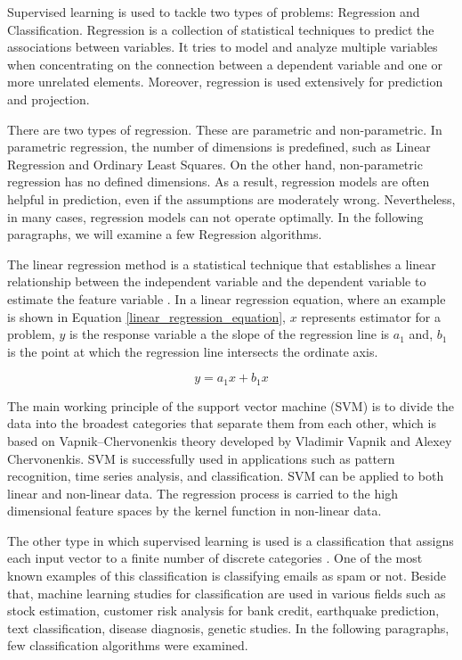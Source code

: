 Supervised learning is used to tackle two types of problems: Regression and Classification. Regression is a collection of statistical techniques to predict the associations between variables. It tries to model and analyze multiple variables when concentrating on the connection between a dependent variable and one or more unrelated elements. Moreover, regression is used extensively for prediction and projection.

There are two types of regression. These are parametric and non-parametric. In parametric regression, the number of dimensions is predefined, such as Linear Regression and Ordinary Least Squares. On the other hand, non-parametric regression has no defined dimensions. As a result, regression models are often helpful in prediction, even if the assumptions are moderately wrong. Nevertheless, in many cases, regression models can not operate optimally. In the following paragraphs, we will examine a few Regression algorithms.

The linear regression method is a statistical technique that establishes a linear relationship between the independent variable and the dependent variable to estimate the feature variable \cite{tan2016introduction}. In a linear regression equation, where an example is shown in Equation \ref{linear_regression_equation}, \(x\) represents estimator for a problem, \(y\) is the response variable a the slope of the regression line is \(a_1\) and, \(b_1\) is the point at which the regression line intersects the ordinate axis.

\begin{equation} \label{linear_regression_equation}
y = a_1x + b_1x
\end{equation}

The main working principle of the support vector machine (SVM) is to divide the data into the broadest categories that separate them from each other, which is based on Vapnik–Chervonenkis theory developed by Vladimir Vapnik and Alexey Chervonenkis. SVM is successfully used in applications such as pattern recognition, time series analysis, and classification. SVM can be applied to both linear and non-linear data. The regression process is carried to the high dimensional feature spaces by the kernel function in non-linear data.

The other type in which supervised learning is used is a classification that assigns each input vector to a finite number of discrete categories \cite{harrington2012machine}. One of the most known examples of this classification is classifying emails as spam or not. Beside that, machine learning studies for classification are used in various fields such as stock estimation, customer risk analysis for bank credit, earthquake prediction, text classification, disease diagnosis, genetic studies. In the following paragraphs, few classification algorithms were examined.

